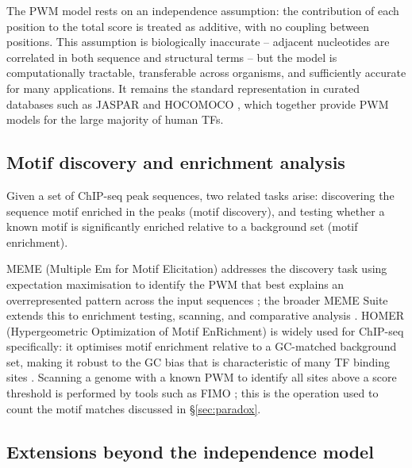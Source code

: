 The PWM model rests on an independence assumption: the contribution of each position to the total score is treated as additive, with no coupling between positions.
This assumption is biologically inaccurate -- adjacent nucleotides are correlated in both sequence and structural terms -- but the model is computationally tractable, transferable across organisms, and sufficiently accurate for many applications.
It remains the standard representation in curated databases such as JASPAR \cite{ovekbaydarJASPAR2026Expansion2026} and HOCOMOCO \cite{vorontsovHOCOMOCO2024Rebuild2024}, which together provide PWM models for the large majority of human TFs.

\subsection{Motif discovery and enrichment analysis}

Given a set of ChIP-seq peak sequences, two related tasks arise:
discovering the sequence motif enriched in the peaks (motif discovery), and testing whether a known motif is significantly enriched relative to a background set (motif enrichment).

MEME (Multiple Em for Motif Elicitation) addresses the discovery task using expectation maximisation to identify the PWM that best explains an overrepresented pattern across the input sequences \cite{baileyUnsupervisedLearningMultiple1995};
the broader MEME Suite extends this to enrichment testing, scanning, and comparative analysis \cite{baileyMEMESuite2015}.
HOMER (Hypergeometric Optimization of Motif EnRichment) is widely used for ChIP-seq specifically:
it optimises motif enrichment relative to a GC-matched background set, making it robust to the GC bias that is characteristic of many TF binding sites \cite{heinzSimpleCombinationsLineageDetermining2010}.
Scanning a genome with a known PWM to identify all sites above a score threshold is performed by tools such as FIMO \cite{grantFIMOScanningOccurrences2011};
this is the operation used to count the motif matches discussed in §\ref{sec:paradox}.

\subsection{Extensions beyond the independence model}

